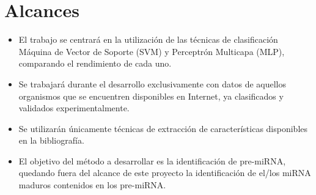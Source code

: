\section{Alcances}

\begin{itemize}
\item El trabajo se centrará en la utilización de las técnicas de
  clasificación Máquina de Vector de Soporte (SVM) y Perceptrón
  Multicapa (MLP), comparando el rendimiento de cada uno.
\item Se trabajará durante el desarrollo exclusivamente con datos de
  aquellos organismos que se encuentren disponibles en Internet, ya
  clasificados y validados experimentalmente.
\item Se utilizarán únicamente técnicas de extracción de
  características disponibles en la bibliografía.
\item El objetivo del método a desarrollar es la identificación de
  pre-miRNA, quedando fuera del alcance de este proyecto la
  identificación de el/los miRNA maduros contenidos en los pre-miRNA.
\end{itemize}